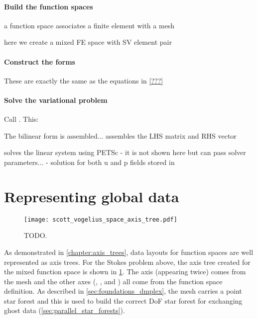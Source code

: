 \documentclass[thesis]{subfiles}
\begin{document}
\paragraph{Build the function spaces}

a function space associates a finite element with a mesh

here we create a mixed FE space with SV element pair

\paragraph{Construct the forms}

These are exactly the same as the equations in \cref{???}

\paragraph{Solve the variational problem}

Call . This:

The bilinear form  is assembled...
assembles the LHS matrix and RHS vector

solves the linear system using PETSc - it is not shown here but can pass solver parameters... - solution for both u and p fields stored in 

\section{Representing global data}

\begin{figure}
  \centering
  \texttt{[image: scott\_vogelius\_space\_axis\_tree.pdf]}
  \caption{
    TODO.
  }
  \label{fig:firedrake_axis_tree}
\end{figure}

As demonstrated in \cref{chapter:axis_trees}, data layouts for function spaces are well represented as axis trees.
For the Stokes problem above, the axis tree created for the mixed function space  is shown in \cref{fig:firedrake_axis_tree}.
The  axis (appearing twice) comes from the mesh and the other axes (, , and ) all come from the function space definition.
As described in \cref{sec:foundations_dmplex}, the mesh carries a point star forest and this is used to build the correct DoF star forest for exchanging ghost data (\cref{sec:parallel_star_forests}).
\end{document}
